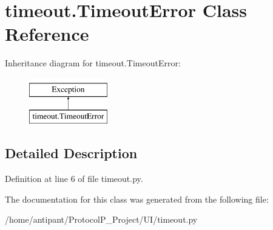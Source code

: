 \hypertarget{classtimeout_1_1TimeoutError}{\section{timeout.\-Timeout\-Error Class Reference}
\label{classtimeout_1_1TimeoutError}
}
Inheritance diagram for timeout.\-Timeout\-Error\-:\begin{figure}[H]
\begin{center}
\leavevmode
\includegraphics[height=2.000000cm]{classtimeout_1_1TimeoutError}
\end{center}
\end{figure}


\subsection{Detailed Description}


Definition at line 6 of file timeout.\-py.



The documentation for this class was generated from the following file\-:\begin{DoxyCompactItemize}
\item 
/home/antipant/\-Protocol\-P\-\_\-\-Project/\-U\-I/timeout.\-py\end{DoxyCompactItemize}
